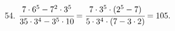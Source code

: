 54. $\cfrac{7\cdot6^5-7^2\cdot3^5}{35\cdot3^4-3^5\cdot10}=
\cfrac{7\cdot3^5\cdot(2^5-7)}{5\cdot3^4\cdot(7-3\cdot2)}=105.$\\
